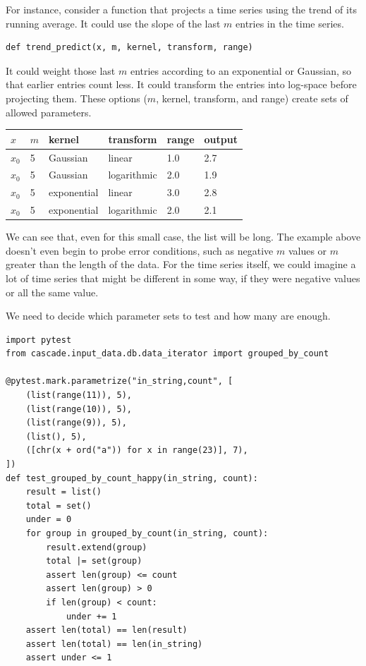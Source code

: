 \documentclass[fleqn,10pt]{olplainarticle}
\begin{document}
For instance, consider a function that projects a time series
using the trend of its running average. It could use the slope
of the last $m$ entries in the time series.
\begin{lstlisting}
def trend_predict(x, m, kernel, transform, range)
\end{lstlisting}
It could weight
those last $m$ entries according to an exponential or Gaussian, so that
earlier entries count less. It could transform the entries
into log-space before projecting them. These options
($m$, kernel, transform, and range) create
sets of allowed parameters.
\begin{center}
\begin{tabular}{|l|l|l|l|l|l|}\hline
$x$ & $m$ & kernel & transform & range & output \\ \hline
$x_0$ & 5 & Gaussian & linear & 1.0 & 2.7 \\
$x_0$ & 5 & Gaussian & logarithmic & 2.0 & 1.9 \\
$x_0$ & 5 & exponential & linear & 3.0 & 2.8 \\
$x_0$ & 5 & exponential & logarithmic & 2.0 & 2.1 \\ \hline
\end{tabular}
\end{center}
We can see that, even for
this small case, the list will be long. The example
above doesn't even begin to probe error conditions, such
as negative $m$ values or $m$ greater than the length
of the data. For the time series itself, we could imagine
a lot of time series that might be different in some way,
if they were negative values or all the same value.

We need to decide which parameter sets to test
and how many are enough.

\begin{lstlisting}
import pytest
from cascade.input_data.db.data_iterator import grouped_by_count

@pytest.mark.parametrize("in_string,count", [
    (list(range(11)), 5),
    (list(range(10)), 5),
    (list(range(9)), 5),
    (list(), 5),
    ([chr(x + ord("a")) for x in range(23)], 7),
])
def test_grouped_by_count_happy(in_string, count):
    result = list()
    total = set()
    under = 0
    for group in grouped_by_count(in_string, count):
        result.extend(group)
        total |= set(group)
        assert len(group) <= count
        assert len(group) > 0
        if len(group) < count:
            under += 1
    assert len(total) == len(result)
    assert len(total) == len(in_string)
    assert under <= 1
\end{lstlisting}
\end{document}
